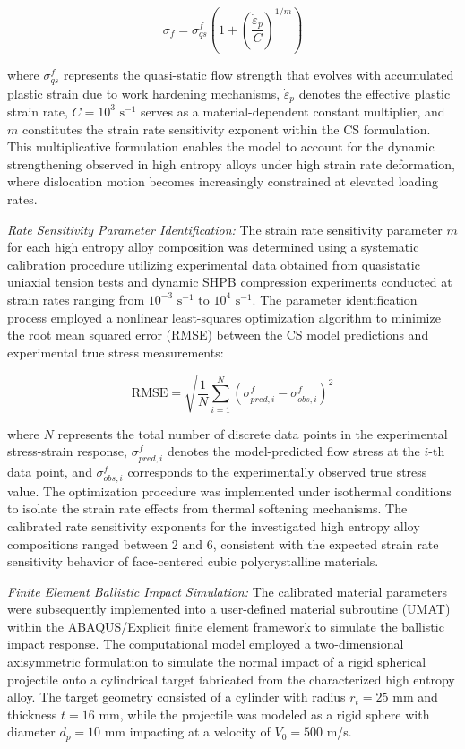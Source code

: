 \begin{equation}
\sigma_f = \sigma_{qs}^f \left(1 + \left(\frac{\dot{\varepsilon}_p}{C}\right)^{1/m}\right)
\end{equation}

where $\sigma_{qs}^f$ represents the quasi-static flow strength that evolves with accumulated plastic strain due to work hardening mechanisms, $\dot{\varepsilon}_p$ denotes the effective plastic strain rate, $C = 10^3 \text{ s}^{-1}$ serves as a material-dependent constant multiplier, and $m$ constitutes the strain rate sensitivity exponent within the CS formulation. This multiplicative formulation enables the model to account for the dynamic strengthening observed in high entropy alloys under high strain rate deformation, where dislocation motion becomes increasingly constrained at elevated loading rates.

\emph{Rate Sensitivity Parameter Identification:} The strain rate sensitivity parameter $m$ for each high entropy alloy composition was determined using a systematic calibration procedure utilizing experimental data obtained from quasistatic uniaxial tension tests and dynamic SHPB compression experiments conducted at strain rates ranging from $10^{-3} \text{ s}^{-1}$ to $10^4 \text{ s}^{-1}$. The parameter identification process employed a nonlinear least-squares optimization algorithm to minimize the root mean squared error (RMSE) between the CS model predictions and experimental true stress measurements:

\begin{equation}
\text{RMSE} = \sqrt{\frac{1}{N}\sum_{i=1}^{N}\left(\sigma_{pred,i}^f - \sigma_{obs,i}^f\right)^2}
\end{equation}

where $N$ represents the total number of discrete data points in the experimental stress-strain response, $\sigma_{pred,i}^f$ denotes the model-predicted flow stress at the $i$-th data point, and $\sigma_{obs,i}^f$ corresponds to the experimentally observed true stress value. The optimization procedure was implemented under isothermal conditions to isolate the strain rate effects from thermal softening mechanisms. The calibrated rate sensitivity exponents for the investigated high entropy alloy compositions ranged between 2 and 6, consistent with the expected strain rate sensitivity behavior of face-centered cubic polycrystalline materials.

\emph{Finite Element Ballistic Impact Simulation:} The calibrated material parameters were subsequently implemented into a user-defined material subroutine (UMAT) within the ABAQUS/Explicit finite element framework to simulate the ballistic impact response. The computational model employed a two-dimensional axisymmetric formulation to simulate the normal impact of a rigid spherical projectile onto a cylindrical target fabricated from the characterized high entropy alloy. The target geometry consisted of a cylinder with radius $r_t = 25$ mm and thickness $t = 16$ mm, while the projectile was modeled as a rigid sphere with diameter $d_p = 10$ mm impacting at a velocity of $V_0 = 500$ m/s.

